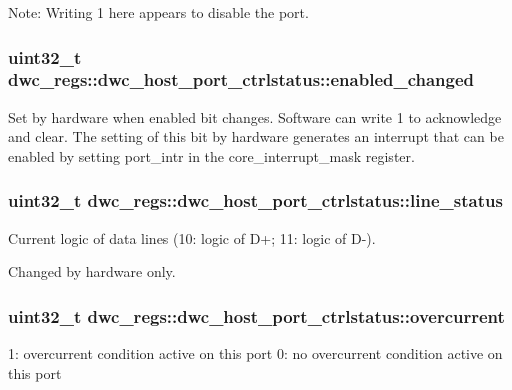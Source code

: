 Note\-: Writing 1 here appears to disable the port. \hypertarget{uniondwc__regs_1_1dwc__host__port__ctrlstatus_a78ec0c970ca183bd219fc38b88b366be}{
\subsubsection[{enabled\-\_\-changed}]{\setlength{\rightskip}{0pt plus 5cm}uint32\-\_\-t dwc\-\_\-regs\-::dwc\-\_\-host\-\_\-port\-\_\-ctrlstatus\-::enabled\-\_\-changed}}\label{uniondwc__regs_1_1dwc__host__port__ctrlstatus_a78ec0c970ca183bd219fc38b88b366be}
Set by hardware when enabled bit changes. Software can write 1 to acknowledge and clear. The setting of this bit by hardware generates an interrupt that can be enabled by setting port\-\_\-intr in the core\-\_\-interrupt\-\_\-mask register. \hypertarget{uniondwc__regs_1_1dwc__host__port__ctrlstatus_ad8a9442e447b333a961a562b1d0eef85}{
\subsubsection[{line\-\_\-status}]{\setlength{\rightskip}{0pt plus 5cm}uint32\-\_\-t dwc\-\_\-regs\-::dwc\-\_\-host\-\_\-port\-\_\-ctrlstatus\-::line\-\_\-status}}\label{uniondwc__regs_1_1dwc__host__port__ctrlstatus_ad8a9442e447b333a961a562b1d0eef85}
Current logic of data lines (10\-: logic of D+; 11\-: logic of D-\/).

Changed by hardware only. \hypertarget{uniondwc__regs_1_1dwc__host__port__ctrlstatus_acc42fd23665b1ff035698152578d70c7}{
\subsubsection[{overcurrent}]{\setlength{\rightskip}{0pt plus 5cm}uint32\-\_\-t dwc\-\_\-regs\-::dwc\-\_\-host\-\_\-port\-\_\-ctrlstatus\-::overcurrent}}\label{uniondwc__regs_1_1dwc__host__port__ctrlstatus_acc42fd23665b1ff035698152578d70c7}
1\-: overcurrent condition active on this port 0\-: no overcurrent condition active on this port

